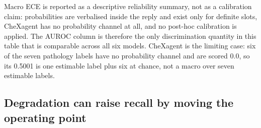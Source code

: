 Macro ECE is reported as a descriptive reliability summary, not as a calibration claim: probabilities are verbalised inside the reply and exist only for definite slots, CheXagent has no probability channel at all, and no post-hoc calibration is applied. The AUROC column is therefore the only discrimination quantity in this table that is comparable across all six models. CheXagent is the limiting case: six of the seven pathology labels have no probability channel and are scored 0.0, so its 0.5001 is one estimable label plus six at chance, not a macro over seven estimable labels.

\subsection{Degradation can raise recall by moving the operating point}
\label{sec:results-op}

